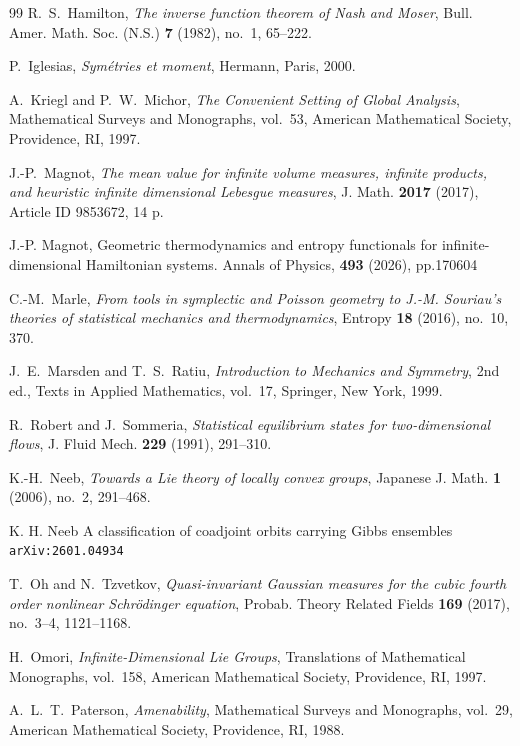 \documentclass[11pt,reqno]{amsart}
\begin{document}
\begin{thebibliography}{99}
R.~S.~Hamilton,
\emph{The inverse function theorem of Nash and Moser},
Bull. Amer. Math. Soc. (N.S.) \textbf{7} (1982), no.~1, 65--222.

P.~Iglesias,
\emph{Symétries et moment},
Hermann, Paris, 2000.

A.~Kriegl and P.~W.~Michor,
\emph{The Convenient Setting of Global Analysis},
Mathematical Surveys and Monographs, vol.~53,
American Mathematical Society, Providence, RI, 1997.

J.-P.~Magnot,
\emph{The mean value for infinite volume measures, infinite products, and heuristic infinite dimensional Lebesgue measures},
J. Math. \textbf{2017} (2017), Article ID 9853672, 14 p.

 J.-P. Magnot, Geometric thermodynamics and entropy functionals for infinite-dimensional Hamiltonian systems. Annals of Physics,  {\bf 493} (2026), pp.170604

C.-M.~Marle,
\emph{From tools in symplectic and Poisson geometry to J.-M. Souriau's theories of statistical mechanics and thermodynamics},
Entropy \textbf{18} (2016), no.~10, 370.

J.~E.~Marsden and T.~S.~Ratiu,
\emph{Introduction to Mechanics and Symmetry},
2nd ed.,
Texts in Applied Mathematics, vol.~17,
Springer, New York, 1999.

R.~Robert and J.~Sommeria,
\emph{Statistical equilibrium states for two-dimensional flows},
J. Fluid Mech. \textbf{229} (1991), 291--310.

K.-H.~Neeb,
\emph{Towards a Lie theory of locally convex groups},
Japanese J. Math. \textbf{1} (2006), no.~2, 291--468.

 K. H. Neeb A classification of coadjoint orbits
carrying Gibbs ensembles \texttt{arXiv:2601.04934}

T.~Oh and N.~Tzvetkov,
\emph{Quasi-invariant Gaussian measures for the cubic fourth order nonlinear Schrödinger equation},
Probab. Theory Related Fields \textbf{169} (2017), no.~3--4, 1121--1168.

H.~Omori,
\emph{Infinite-Dimensional Lie Groups},
Translations of Mathematical Monographs, vol.~158,
American Mathematical Society, Providence, RI, 1997.

A.~L.~T.~Paterson,
\emph{Amenability},
Mathematical Surveys and Monographs, vol.~29,
American Mathematical Society, Providence, RI, 1988.


\end{thebibliography}
\end{document}
